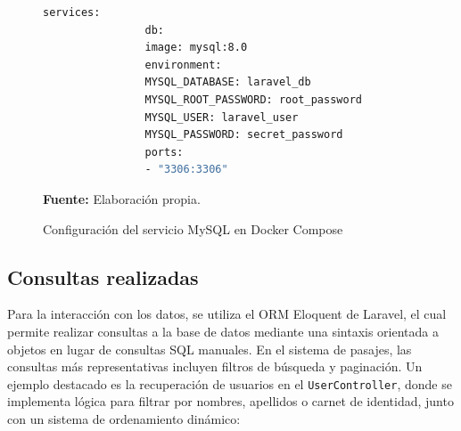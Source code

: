 \documentclass[12pt,letterpaper]{report}
\begin{document}
	
	\begin{figure}[H]
		\centering
		\begin{minipage}{0.9\textwidth}
			
			\caption{Configuración del servicio MySQL en Docker Compose}
			\label{fig:docker_config}
			
			\vspace{4pt}
			
			\begin{lstlisting}[language=bash, frame=single, breaklines=true, basicstyle=\ttfamily\scriptsize]
				services:
				db:
				image: mysql:8.0
				environment:
				MYSQL_DATABASE: laravel_db
				MYSQL_ROOT_PASSWORD: root_password
				MYSQL_USER: laravel_user
				MYSQL_PASSWORD: secret_password
				ports:
				- "3306:3306"
			\end{lstlisting}
			
			\vspace{2pt}
			\raggedright
			{\small \textbf{Fuente:} Elaboración propia.}
			
		\end{minipage}
	\end{figure}
	
	\subsection{Consultas realizadas}
	Para la interacción con los datos, se utiliza el ORM Eloquent de Laravel, el cual permite realizar consultas a la base de datos mediante una sintaxis orientada a objetos en lugar de consultas SQL manuales. En el sistema de pasajes, las consultas más representativas incluyen filtros de búsqueda y paginación. Un ejemplo destacado es la recuperación de usuarios en el \texttt{UserController}, donde se implementa lógica para filtrar por nombres, apellidos o carnet de identidad, junto con un sistema de ordenamiento dinámico:
	
\end{document}
